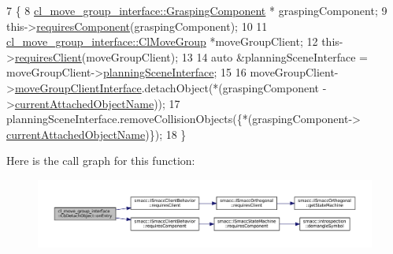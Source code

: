 \begin{DoxyCode}
7     \{
8         \hyperlink{classcl__move__group__interface_1_1GraspingComponent}{cl\_move\_group\_interface::GraspingComponent} *
      graspingComponent;
9         this->\hyperlink{classsmacc_1_1ISmaccClientBehavior_a19c6d658c8e809bb93bfdc9b639a3ac3}{requiresComponent}(graspingComponent);
10 
11         \hyperlink{classcl__move__group__interface_1_1ClMoveGroup}{cl\_move\_group\_interface::ClMoveGroup} *moveGroupClient;
12         this->\hyperlink{classsmacc_1_1ISmaccClientBehavior_a32b16e99e3b4cb289414203dc861a440}{requiresClient}(moveGroupClient);
13 
14         \textcolor{keyword}{auto} &planningSceneInterface = moveGroupClient->\hyperlink{classcl__move__group__interface_1_1ClMoveGroup_a11bfab580f36e2ad32c9b37d6f58f44c}{planningSceneInterface};
15 
16         moveGroupClient->\hyperlink{classcl__move__group__interface_1_1ClMoveGroup_a92922ea689e4e1b7b91512c56629c95b}{moveGroupClientInterface}.detachObject(*(graspingComponent
      ->\hyperlink{classcl__move__group__interface_1_1GraspingComponent_a486b5c831dc81ae0bf909b585ba7c615}{currentAttachedObjectName}));
17         planningSceneInterface.removeCollisionObjects(\{*(graspingComponent->
      \hyperlink{classcl__move__group__interface_1_1GraspingComponent_a486b5c831dc81ae0bf909b585ba7c615}{currentAttachedObjectName})\});
18     \}
\end{DoxyCode}
Here is the call graph for this function\+:
\nopagebreak
\begin{figure}[H]
\begin{center}
\leavevmode
\includegraphics[width=350pt]{classcl__move__group__interface_1_1CbDetachObject_a04af88f1d9b64c43eb2620ac5bd62c35_cgraph}
\end{center}
\end{figure}
\mbox{\label{classcl__move__group__interface_1_1CbDetachObject_ae5c6ada3c6631c9fa0bfb2d461ce4678}} 
